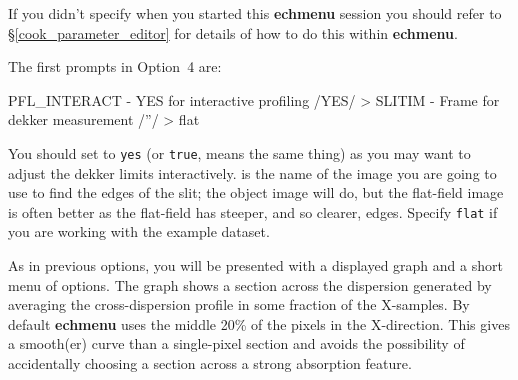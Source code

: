 \documentclass[twoside,11pt]{starlink}
\providecommand{\scspec}[2]{#1}
\begin{document}
If you didn't specify  when you started this
\textbf{echmenu} session you should refer to
\scspec{\S\ref{cook_parameter_editor}}
{\htmlref{How to Use the \textbf{echmenu} Parameter Editor}
{cook_parameter_editor}} for details of how to do this within
\textbf{echmenu}\@.

The first prompts in Option~4 are:

{
\scspec{\small}{ }
\begin{terminalv}
   PFL_INTERACT - YES for interactive profiling /YES/ >
   SLITIM - Frame for dekker measurement /''/ > flat
\end{terminalv}
}

You should set
 to \verb+yes+
(or \verb+true+, means the same thing) as you may want to adjust the
dekker limits interactively.
 is the name of the image you
are going to use to find the edges of the slit; the object image will
do, but the flat-field image is often better as the flat-field has
steeper, and so clearer, edges.
Specify \verb+flat+ if you are working with the example dataset.

As in previous options, you will be presented with a displayed graph and a
short menu of options.  The graph shows a section across the dispersion
generated by averaging the cross-dispersion profile in some fraction
of the X-samples.  By default \textbf{echmenu} uses the middle 20\% of the
pixels in the X-direction.
This gives a smooth(er) curve than a single-pixel section
and avoids the possibility of accidentally choosing a section across a
strong absorption feature.
\end{document}
